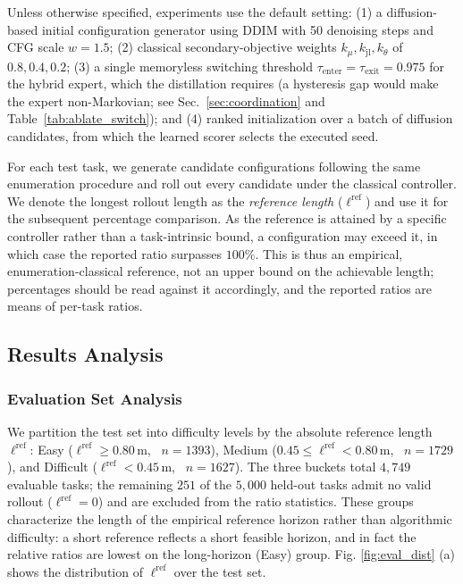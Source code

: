 \documentclass[journal, twoside]{IEEEtran}
\begin{document}
Unless otherwise specified, experiments use the default setting: (1) a diffusion-based initial configuration generator using DDIM with 50 denoising steps and CFG scale $w=1.5$; (2) classical secondary-objective weights $k_{\mu},k_{\mathrm{jl}},k_{\theta}$ of $0.8,0.4,0.2$; (3) a single memoryless switching threshold $\tau_{\mathrm{enter}}=\tau_{\mathrm{exit}}=0.975$ for the hybrid expert, which the distillation requires (a hysteresis gap would make the expert non-Markovian; see Sec.~\ref{sec:coordination} and Table~\ref{tab:ablate_switch}); and (4) ranked initialization over a batch of diffusion candidates, from which the learned scorer selects the executed seed.

For each test task, we generate candidate configurations following the same enumeration procedure and roll out every candidate under the classical controller. We denote the longest rollout length as the \emph{reference length} ($\ell^{\mathrm{ref}}$) and use it for the subsequent percentage comparison. As the reference is attained by a specific controller rather than a task-intrinsic bound, a configuration may exceed it, in which case the reported ratio surpasses $100\%$. This is thus an empirical, enumeration-classical reference, not an upper bound on the achievable length; percentages should be read against it accordingly, and the reported ratios are means of per-task ratios.


\subsection{Results Analysis}
\subsubsection{Evaluation Set Analysis}
We partition the test set into difficulty levels by the absolute reference length $\ell^{\mathrm{ref}}$: Easy ($\ell^{\mathrm{ref}}\ge 0.80$\,m, ~$n{=}1393$), Medium ($0.45\le\ell^{\mathrm{ref}}<0.80$\,m, ~$n{=}1729$), and Difficult ($\ell^{\mathrm{ref}}<0.45$\,m, ~$n{=}1627$). The three buckets total $4{,}749$ evaluable tasks; the remaining $251$ of the $5{,}000$ held-out tasks admit no valid rollout ($\ell^{\mathrm{ref}}{=}0$) and are excluded from the ratio statistics. These groups characterize the length of the empirical reference horizon rather than algorithmic difficulty: a short reference reflects a short feasible horizon, and in fact the relative ratios are lowest on the long-horizon (Easy) group. Fig. \ref{fig:eval_dist} (a) shows the distribution of $\ell^{\mathrm{ref}}$ over the test set.
\end{document}
